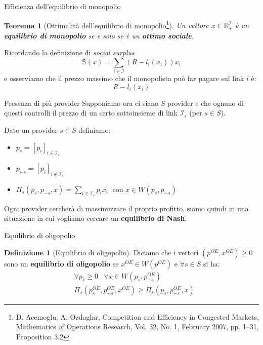 \documentclass{beamer}
\newcounter{counter1}
\theoremstyle{plain}
\newtheorem{myteo}[counter1]{Teorema}
\theoremstyle{definition}
\newtheorem{mydef}[counter1]{Definizione}
\theoremstyle{remark}
\newcommand{\pa}[1]{\left(#1\right)}
\newcommand{\bra}[1]{\left[#1\right]}
\begin{document}
\begin{frame}{Efficienza dell'equilibrio di monopolio}
  \begin{myteo}[Ottimalità dell'equilibrio di
    monopolio\footnote{D. Acemoglu, A. Ozdaglar, Competition and
      Efficiency in Congested Markets, Mathematics of Operations
      Research, Vol. 32, No. 1, February 2007, pp. 1–31, Proposition 3.2}]
    Un vettore $x\in \mathbb{R}_+^\mathcal{I}$ è un \textbf{equilibrio
      di monopolio} se e solo se è un \textbf{ottimo sociale}.
  \end{myteo}

  Ricordando la definizione di \textit{social surplus}
  \[ \mathbb{S}(x) = \sum _{i\in\mathcal{I}}\pa{ R -
      l_i\pa{x_i}}x_i \]
  e osserviamo che il prezzo massimo che il monopolista può far pagare
  sul link $i$ è:
  \[ R - l_i(x_i) \]
\end{frame}

\begin{frame}{Presenza di più provider}
  Supponiamo ora ci siano $S$ provider e che ognuno di questi
  controlli il prezzo di un certo sottoinsieme di link $\mathcal{I}_s$
  (per $s\in S$).

  Dato un provider $s\in S$ definiamo:
  \begin{itemize}
  \item $p_s = \bra{p_i}_{i\in \mathcal{I}_s}$
  \item $p_{-s} = \bra{p_i}_{i\not\in \mathcal{I}_s}$
   \item $\displaystyle \Pi _s \pa{p_s, p_{-s},x} = \sum _{i\in
       \mathcal{I}_s} p_i x_i\;$ con $x\in W\pa{p_s, p_{-s}}$
  \end{itemize}
  
  Ogni provider cercherà di massimizzare il proprio profitto, siamo
  quindi in una situazione in cui vogliamo cercare un
  \textbf{equilibrio di Nash}.
\end{frame}

\begin{frame}{Equilibrio di oligopolio}
  \begin{mydef}[Equilibrio di oligopolio]
    Diciamo che i vettori $\pa{p^{OE},x^{OE}}\ge 0$ sono un
    \textbf{equilibrio di oligopolio} se $x^{OE}\in W\pa{p^{OE}}$ e
    $\forall s\in S$ si ha:
    \begin{align*}
      & \forall p_s \ge 0\;\;\; \forall x\in W\pa{p_s,p^{OE}_{-s}} \\
      & \Pi_s \pa{p^{OE}_s, p^{OE}_{-s},x^{OE}} \ge \Pi _s \pa{p_s, p^{OE}_{-s},x}
    \end{align*}
  \end{mydef}
\end{frame}
\end{document}

